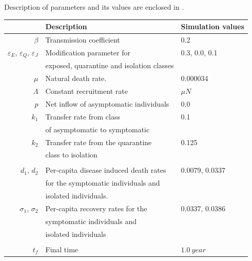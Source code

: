 Description of parameters and its values are enclosed 
in .
%
\begin{table}[htb]
    \begin{center}
      \begin{tabular}{@{}rll@{}}
        \toprule
        & \multicolumn{1}{l}{\bf{Description}}
        & \multicolumn{1}{l}{\bf{Simulation values}}
        \\
        \midrule
        $\beta$
          & Transmission coefficient
          & \num{0.2}
        \\
        $\varepsilon_E$, 
        $\varepsilon_Q$,
        $\varepsilon_J$
          & Modification parameter for 
          & \num{0.3}, \num{0.0}, \num{0.1}
          \\
          &  exposed, quarantine and isolation classes 
          \\
        $\mu$
          & Natural death rate.
          & \num{0.000034}
        \\
        $\Lambda$
          & Constant recruitment rate
          & $\mu N$
        \\
        $p$
          & Net inflow of asymptomatic individuals
          & \num{0.0}
        \\
        $k_1$ 
          & Transfer rate from class 
          & \num{0.1}
          \\
          & of asymptomatic to symptomatic
          \\
        $k_2$
          & Transfer rate from the quarantine 
          & \num{0.125}
          \\ 
          & class to isolation
        \\
        \\
        $d_1$, $d_2$
          & Per-capita disease induced death rates 
          & \num{0.0079}, \num{0.0337}
          \\
          & for the symptomatic individuals and 
          \\
          & isolated individuals.
        \\
        $\sigma_1$, $\sigma_2$
          & Per-capita recovery rates for the 
          & \num{0.0337}, \num{0.0386}
          \\
          & symptomatic individuals and 
          \\
          &  isolated individuals
        \\
        \\
        $t_f$
          & Final time 
          & $\SI{1.0}{year}$

\end{tabular}
\end{center}
\end{table}
